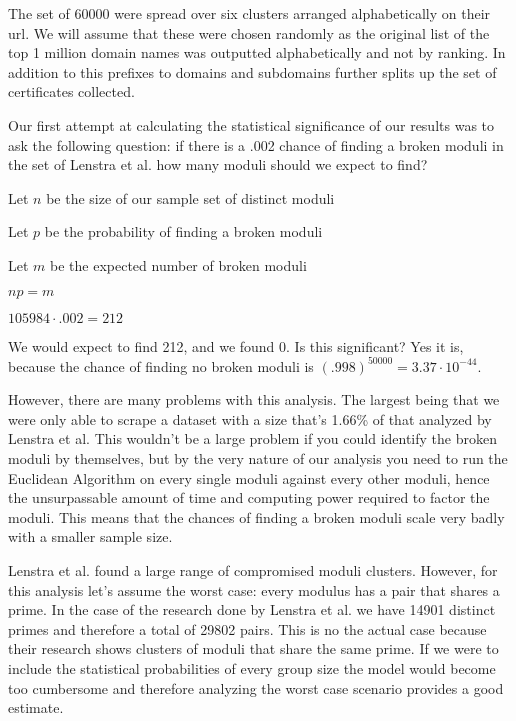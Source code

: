 \documentclass[11pt,twoside]{article}
\begin{document}
\begin{multicols}{2}
The set of 60000 were spread over six clusters arranged alphabetically on their
url. We will assume that these were chosen randomly as the original list of the
top 1 million domain names was outputted alphabetically and not by ranking. In
addition to this prefixes to domains and subdomains further splits up the set of
certificates collected. 

Our first attempt at calculating the statistical significance of our results was
to ask the following question: if there is a .002 chance of finding a broken
moduli in the set of Lenstra et al. how many moduli should we expect to find?

\begin{compactitem}
\item Let $n$ be the size of our sample set of distinct moduli
\item Let $p$ be the probability of finding a broken moduli
\item Let $m$ be the expected number of broken moduli
\item $np = m$
\item $105984 \cdot .002 = 212$
\end{compactitem}


We would expect to find 212, and we found 0. Is this significant? Yes it is,
because the chance of finding no broken moduli is $(.998)^{50 000} = 
3.37\cdot10^{-44}$.

However, there are many problems with this analysis. The largest being that we
were only able to scrape a dataset with a size that's 1.66\% of that analyzed by
Lenstra et al. This wouldn't be a large problem if you could identify the broken
moduli by themselves, but by the very nature of our analysis you need to run the
Euclidean Algorithm on every single moduli against every other moduli, hence the
unsurpassable amount of time and computing power required to factor the moduli.
This means that the chances of finding a broken moduli scale very badly with a
smaller sample size. 

Lenstra et al. found a large range of compromised moduli clusters. However, for
this analysis let's assume the worst case: every modulus has a pair that shares
a prime. In the case of the research done by Lenstra et al. we have 14901
distinct primes and therefore a total of 29802 pairs. This is no the actual case
because their research shows clusters of moduli that share the same prime. If we
were to include the statistical probabilities of every group size the model
would become too cumbersome and therefore analyzing the worst case scenario
provides a good estimate.


\end{multicols}
\end{document}
